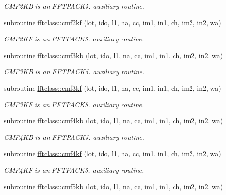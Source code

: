 \begin{DoxyCompactItemize}
\begin{DoxyCompactList}\small\item\em C\+M\+F2\+KB is an F\+F\+T\+P\+A\+C\+K5. auxiliary routine. \end{DoxyCompactList}\item 
subroutine \mbox{\hyperlink{namespacefftclass_a87e04f91c6fd5a8be5cce797b134f4c3}{fftclass\+::cmf2kf}} (lot, ido, l1, na, cc, im1, in1, ch, im2, in2, wa)
\begin{DoxyCompactList}\small\item\em C\+M\+F2\+KF is an F\+F\+T\+P\+A\+C\+K5. auxiliary routine. \end{DoxyCompactList}\item 
subroutine \mbox{\hyperlink{namespacefftclass_afc9e57527719d38dc3716ee9bf6b090d}{fftclass\+::cmf3kb}} (lot, ido, l1, na, cc, im1, in1, ch, im2, in2, wa)
\begin{DoxyCompactList}\small\item\em C\+M\+F3\+KB is an F\+F\+T\+P\+A\+C\+K5. auxiliary routine. \end{DoxyCompactList}\item 
subroutine \mbox{\hyperlink{namespacefftclass_a449e799516aa491a87b0f5937a7abc86}{fftclass\+::cmf3kf}} (lot, ido, l1, na, cc, im1, in1, ch, im2, in2, wa)
\begin{DoxyCompactList}\small\item\em C\+M\+F3\+KF is an F\+F\+T\+P\+A\+C\+K5. auxiliary routine. \end{DoxyCompactList}\item 
subroutine \mbox{\hyperlink{namespacefftclass_ad51087e9f2795e7bf337d4c6b55de780}{fftclass\+::cmf4kb}} (lot, ido, l1, na, cc, im1, in1, ch, im2, in2, wa)
\begin{DoxyCompactList}\small\item\em C\+M\+F4\+KB is an F\+F\+T\+P\+A\+C\+K5. auxiliary routine. \end{DoxyCompactList}\item 
subroutine \mbox{\hyperlink{namespacefftclass_acdd67c6a77ecec55c036ab8899c07dee}{fftclass\+::cmf4kf}} (lot, ido, l1, na, cc, im1, in1, ch, im2, in2, wa)
\begin{DoxyCompactList}\small\item\em C\+M\+F4\+KF is an F\+F\+T\+P\+A\+C\+K5. auxiliary routine. \end{DoxyCompactList}\item 
subroutine \mbox{\hyperlink{namespacefftclass_a4bf0caaf1c5caeb50490706cd35d82c5}{fftclass\+::cmf5kb}} (lot, ido, l1, na, cc, im1, in1, ch, im2, in2, wa)

\end{DoxyCompactItemize}

